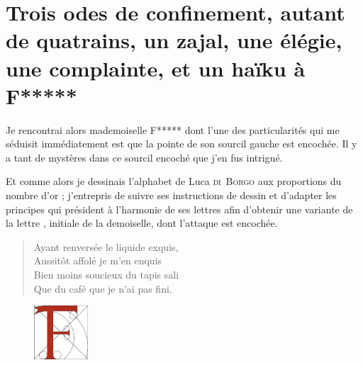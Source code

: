 \afterpage{}
\section*{Trois odes de confinement, autant de quatrains, un zajal, une élégie, une complainte, et un haïku à F*****}

\begin{prose}
  Je rencontrai alors mademoiselle F***** dont l’une des particularités qui me séduisit immédiatement est que la pointe de son sourcil gauche est encochée. Il y a tant de mystères dans ce sourcil encoché que j’en fus intrigué.

  Et comme alors je dessinais l’alphabet de Luca \textsc{di~Borgo} aux proportions du nombre d’or ; j’entrepris de suivre ses instructions de dessin et d’adapter les principes qui président à l’harmonie de ses lettres afin d’obtenir une variante de la lettre , initiale de la demoiselle, dont l’attaque est encochée. 

\end{prose}




\begin{verse}%
  \quatrain%
%
  Ayant renversée le liquide exquis,\\  %
  Aussitôt affolé je m’en enquis\\  %
  Bien moins soucieux du tapis sali\\  %
  Que du café que je n’ai pas fini.
\end{verse}

\begin{figure}[h]
  \centering
  \includegraphics[height=2cm]{F.pdf}
  \captionsetup{labelformat=empty}
  \caption[Lettre  à l’attaque encochée]{}
\end{figure}



